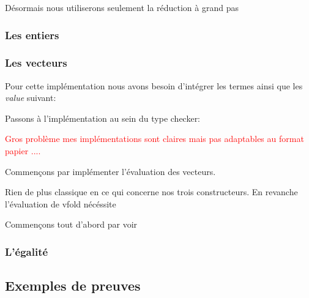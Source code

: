 \documentclass {article}
\newcommand{\codefrom}[3]
           {}
\theoremstyle{definition}
\theoremstyle{remark}
\newcommand{\todo}[1]{\textcolor{red}{#1}}
\begin{document}
Désormais nous utiliserons seulement la réduction à grand pas




\subsubsection{Les entiers}

\subsubsection{Les vecteurs}

Pour cette implémentation nous avons besoin d'intégrer les termes ainsi que les \emph{value} suivant:

\codefrom{dependent}{lambda}{terme_vector}
\codefrom{dependent}{lambda}{terme_dfold}
\codefrom{dependent}{lambda}{Value_Vector}


Passons à l'implémentation au sein du type checker:

\codefrom{dependent}{lambda}{check_vec}
\codefrom{dependent}{lambda}{check_dnil}
\codefrom{dependent}{lambda}{check_dcons}

\todo{Gros problème mes implémentations sont claires mais pas adaptables au format papier ....}


Commençons par implémenter l'évaluation des vecteurs.
\codefrom{dependent}{lambda}{big_step_vec}
Rien de plus classique en ce qui concerne nos trois constructeurs. 
En revanche l'évaluation de vfold nécéssite 



\codefrom{dependent}{lambda}{vfold}

Commençons tout d'abord par voir

\subsubsection{L'égalité}




\subsection{Exemples de preuves}
\end{document}
